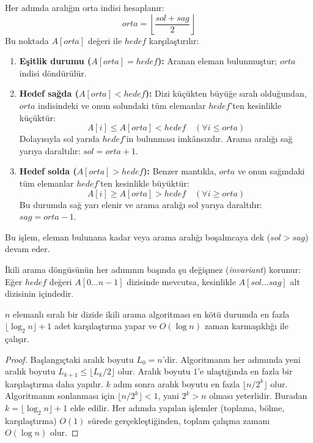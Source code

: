 Her adımda aralığın orta indisi hesaplanır:
\[ orta = \left\lfloor \frac{sol + sag}{2} \right\rfloor \]
Bu noktada $A[orta]$ değeri ile $hedef$ karşılaştırılır:
\begin{enumerate}
    \item \textbf{Eşitlik durumu ($A[orta] = hedef$):} Aranan eleman bulunmuştur; $orta$ indisi döndürülür.
    \item \textbf{Hedef sağda ($A[orta] < hedef$):} Dizi küçükten büyüğe sıralı olduğundan, $orta$ indisindeki ve onun solundaki tüm elemanlar $hedef$'ten kesinlikle küçüktür:
    \[ A[i] \le A[orta] < hedef \quad (\forall i \le orta) \]
    Dolayısıyla sol yarıda $hedef$'in bulunması imkânsızdır. Arama aralığı sağ yarıya daraltılır: $sol = orta + 1$.
    \item \textbf{Hedef solda ($A[orta] > hedef$):} Benzer mantıkla, $orta$ ve onun sağındaki tüm elemanlar $hedef$'ten kesinlikle büyüktür:
    \[ A[i] \ge A[orta] > hedef \quad (\forall i \ge orta) \]
    Bu durumda sağ yarı elenir ve arama aralığı sol yarıya daraltılır: $sag = orta - 1$.
\end{enumerate}
Bu işlem, eleman bulunana kadar veya arama aralığı boşalıncaya dek ($sol > sag$) devam eder.

\begin{definition}
İkili arama döngüsünün her adımının başında şu değişmez (\emph{invariant}) korunur:
Eğer $hedef$ değeri $A[0 \dots n-1]$ dizisinde mevcutsa, kesinlikle $A[sol \dots sag]$ alt dizisinin içindedir.
\end{definition}

\begin{theorem}
$n$ elemanlı sıralı bir dizide ikili arama algoritması en kötü durumda en fazla $\lfloor \log_2 n \rfloor + 1$ adet karşılaştırma yapar ve $O(\log n)$ zaman karmaşıklığı ile çalışır.
\end{theorem}

\begin{proof}
Başlangıçtaki aralık boyutu $L_0 = n$'dir. Algoritmanın her adımında yeni aralık boyutu $L_{k+1} \le \lfloor L_k / 2 \rfloor$ olur.
Aralık boyutu $1$'e ulaştığında en fazla bir karşılaştırma daha yapılır.
$k$ adım sonra aralık boyutu en fazla $\lfloor n / 2^k \rfloor$ olur.
Algoritmanın sonlanması için $\lfloor n / 2^k \rfloor < 1$, yani $2^k > n$ olması yeterlidir.
Buradan $k = \lfloor \log_2 n \rfloor + 1$ elde edilir. Her adımda yapılan işlemler (toplama, bölme, karşılaştırma) $O(1)$ sürede gerçekleştiğinden, toplam çalışma zamanı $O(\log n)$ olur.
\end{proof}

